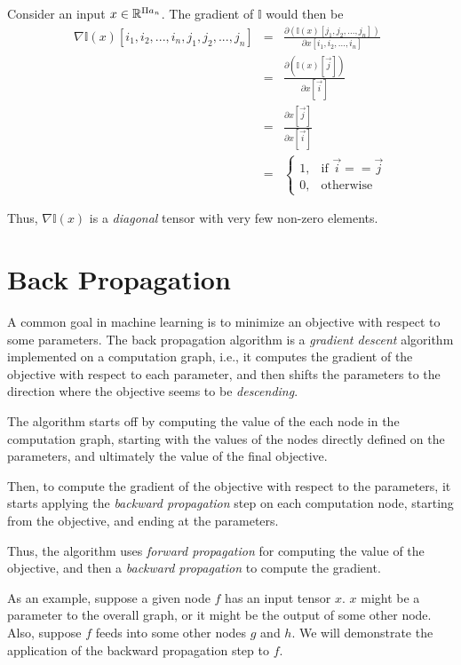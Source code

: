 \documentclass{article}
\begin{document}
  Consider an input 
  $x \in \mathbb{R}^{\Pi a_n}$.
  The gradient of $\mathbb{I}$ would then be
  \begin{eqnarray*}
    \nabla \mathbb{I}(x)[i_1, i_2, ..., i_n, j_1, j_2, ..., j_n]
    & = & \frac{\partial (\mathbb{I}(x)[j_1, j_2, ..., j_n])}
               {\partial x[i_1, i_2, ..., i_n]} \\
    & = & \frac{\partial (\mathbb{I}(x)[\overrightarrow{j}])}
               {\partial x[\overrightarrow{i}]} \\
    & = & \frac{\partial x[\overrightarrow{j}]}
               {\partial x[\overrightarrow{i}]} \\
    & = & \begin{cases}
            1, & \text{if } \overrightarrow{i} == \overrightarrow{j}\\
            0, & \text{otherwise}
          \end{cases}
  \end{eqnarray*}
  
  Thus, $\nabla \mathbb{I}(x)$ is a \emph{diagonal} tensor with
  very few non-zero elements.
  
\section{Back Propagation}
  A common goal in machine learning is
  to minimize an objective with respect to some parameters.
  The back propagation algorithm is a \emph{gradient descent} algorithm
  implemented on a computation graph, i.e.,
  it computes the gradient of the objective
  with respect to each parameter,
  and then shifts the parameters to the direction
  where the objective seems to be \emph{descending}.
  
  The algorithm starts off by computing the value of the each node
  in the computation graph,
  starting with the values of the nodes directly defined on the parameters, 
  and ultimately the value of the final objective.
  
  Then, to compute the gradient of the objective
  with respect to the parameters,
  it starts applying the \emph{backward propagation} step
  on each computation node, starting from the objective,
  and ending at the parameters.
  
  Thus, the algorithm uses \emph{forward propagation}
  for computing the value of the objective,
  and then a \emph{backward propagation} to compute the gradient.
  
  As an example, suppose a given node $f$ has an input tensor $x$.
  $x$ might be a parameter to the overall graph, 
  or it might be the output of some other node.
  Also, suppose $f$ feeds into some other nodes $g$ and $h$.
  We will demonstrate the application of the backward propagation step
  to $f$.
  
\end{document}
